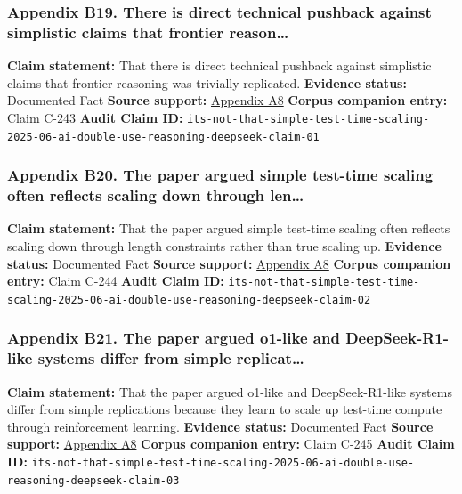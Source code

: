 \documentclass[
  american,
  11pt,
  letterpaper,
]{article}
\begin{document}
\subsubsection{Appendix B19. There is direct technical pushback against
simplistic claims that frontier
reason\ldots{}}\label{appendix-b19-there-is-direct-technical-pushback-against-simplistic-claims-that-frontier-reason}

\textbf{Claim statement:} That there is direct technical pushback
against simplistic claims that frontier reasoning was trivially
replicated. \textbf{Evidence status:} Documented Fact \textbf{Source
support:}
\hyperref[appendix-a8-it-s-not-that-simple-an-analysis-of-simple-test-time-scaling]{Appendix
A8} \textbf{Corpus companion entry:} Claim C-243 \textbf{Audit Claim
ID:}
\texttt{its-not-that-simple-test-time-scaling-2025-06-ai-double-use-reasoning-deepseek-claim-01}

\subsubsection{Appendix B20. The paper argued simple test-time scaling
often reflects scaling down through
len\ldots{}}\label{appendix-b20-the-paper-argued-simple-test-time-scaling-often-reflects-scaling-down-through-len}

\textbf{Claim statement:} That the paper argued simple test-time scaling
often reflects scaling down through length constraints rather than true
scaling up. \textbf{Evidence status:} Documented Fact \textbf{Source
support:}
\hyperref[appendix-a8-it-s-not-that-simple-an-analysis-of-simple-test-time-scaling]{Appendix
A8} \textbf{Corpus companion entry:} Claim C-244 \textbf{Audit Claim
ID:}
\texttt{its-not-that-simple-test-time-scaling-2025-06-ai-double-use-reasoning-deepseek-claim-02}

\subsubsection{Appendix B21. The paper argued o1-like and
DeepSeek-R1-like systems differ from simple
replicat\ldots{}}\label{appendix-b21-the-paper-argued-o1-like-and-deepseek-r1-like-systems-differ-from-simple-replicat}

\textbf{Claim statement:} That the paper argued o1-like and
DeepSeek-R1-like systems differ from simple replications because they
learn to scale up test-time compute through reinforcement learning.
\textbf{Evidence status:} Documented Fact \textbf{Source support:}
\hyperref[appendix-a8-it-s-not-that-simple-an-analysis-of-simple-test-time-scaling]{Appendix
A8} \textbf{Corpus companion entry:} Claim C-245 \textbf{Audit Claim
ID:}
\texttt{its-not-that-simple-test-time-scaling-2025-06-ai-double-use-reasoning-deepseek-claim-03}
\end{document}
